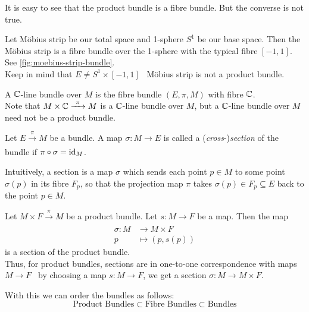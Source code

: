 It is easy to see that the product bundle is a fibre bundle. But the converse is not true.
\begin{example}
	Let M\"obius strip be our total space and 1-sphere \(S^1\) be our base space. Then the M\"obius strip is a fibre bundle over the 1-sphere with the typical fibre \([-1, 1]\). See \cref{fig:moebius-strip-bundle}.\\
	Keep in mind that \(E \ne S^1 \times [-1, 1]\) \ie\ M\"obius strip is not a product bundle.
\end{example}

\begin{example}
	A \(\mathbb C\)-line bundle over \(M\) is the fibre bundle \((E,\pi,M)\) with fibre \(\mathbb C\). \\
	Note that \(M \times \mathbb C \xrightarrow[]{\ \pi\ } M\) is a \(\mathbb C\)-line bundle over \(M\), but a \(\mathbb C\)-line bundle over \(M\) need not be a product bundle.
\end{example}

\begin{definition}[Section]
	Let \(E \xrightarrow[]{\ \pi\ } M\) be a bundle. A map \(\sigma: M \to E\) is called a (\emph{cross}-)\emph{section} of the bundle if \(\pi \circ \sigma = \operatorname{id}_M\).
\end{definition}

Intuitively, a section is a map \(\sigma\) which sends each point \(p \in M\) to some point \(\sigma(p)\) in its fibre \(F_p\), so that the projection map \(\pi\) takes \(\sigma(p) \in F_p \subseteq E\) back to the point \(p \in M\).

\begin{example}
	Let \(M \times F \xrightarrow[]{\ \pi\ } M\) be a product bundle. Let \(s: M \to F\) be a map. Then the map
	\begin{equation}
		\begin{aligned}
			\sigma: M & \to M \times F    \\
			p         & \mapsto (p, s(p))
		\end{aligned}
	\end{equation}
	is a section of the product bundle. \\
	Thus, for product bundles, sections are in one-to-one correspondence with maps \(M \to F\) \ie\ by choosing a map \(s: M \to F\), we get a section \(\sigma: M \to M \times F\).
\end{example}
With this we can order the bundles as follows:
\begin{equation}
	\text{Product Bundles} \subset \text{Fibre Bundles} \subset \text{Bundles}
\end{equation}

